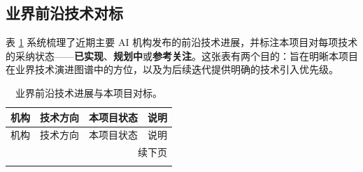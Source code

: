 \documentclass[11pt,a4paper]{article}
\begin{document}
\subsection{业界前沿技术对标}

表 \ref{tab:industry-advances} 系统梳理了近期主要 AI 机构发布的前沿技术进展，并标注本项目对每项技术的采纳状态——\textbf{已实现}、\textbf{规划中}或\textbf{参考关注}。这张表有两个目的：旨在明晰本项目在业界技术演进图谱中的方位，以及为后续迭代提供明确的技术引入优先级。

\begin{longtable}{p{1.8cm} p{3.0cm} p{1.5cm} p{6.8cm}}
\caption{业界前沿技术进展与本项目对标。}\label{tab:industry-advances} \\
\toprule
机构 & 技术方向 & 本项目状态 & 说明 \\
\midrule
\endfirsthead
\toprule
机构 & 技术方向 & 本项目状态 & 说明 \\
\midrule
\endhead
\midrule
\multicolumn{4}{r}{\footnotesize 续下页} \\
\endfoot
\bottomrule
\endlastfoot


\end{longtable}
\end{document}
